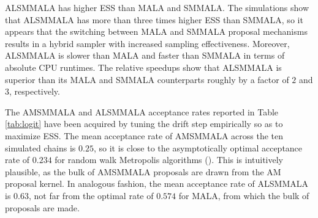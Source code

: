 \documentclass[twoside,11pt]{article}
\begin{document}
{ALSMMALA has higher ESS than MALA and SMMALA. The simulations show that ALSMMALA has more than three times higher ESS than
SMMALA, so it appears that the switching between MALA and SMMALA proposal mechanisms results in a hybrid sampler with 
increased sampling effectiveness. Moreover, ALSMMALA is slower than MALA and faster than SMMALA in terms of absolute CPU
runtimes. The relative speedups show that ALSMMALA is superior than its MALA and SMMALA counterparts roughly by a factor of
$2$ and $3$, respectively.

The AMSMMALA and ALSMMALA acceptance rates reported in Table \ref{tab:logit} have been acquired by tuning the drift step 
empirically so as to maximize ESS. The mean acceptance rate of AMSMMALA across the ten simulated chains is $0.25$, so it is 
close to the asymptotically optimal acceptance rate of $0.234$ for random walk Metropolis algorithms 
(\cite{rob_gel_gil__wea}). This is intuitively plausible, as the bulk of AMSMMALA proposals are drawn from the AM proposal 
kernel. In analogous fashion, the mean acceptance rate of ALSMMALA is $0.63$, not far from the optimal rate of $0.574$ for
MALA, from which the bulk of proposals are made.

}
\end{document}

